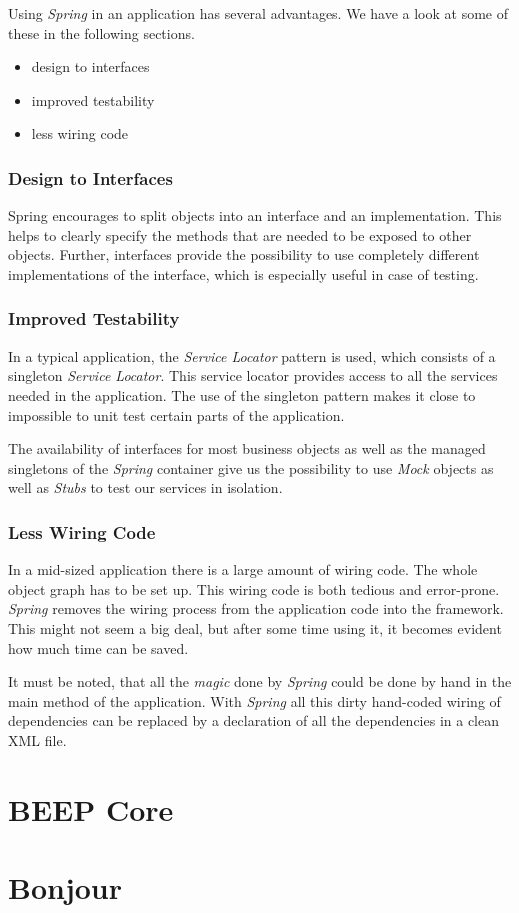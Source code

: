 Using \emph{Spring} in an application has several advantages. We have a look
at some of these in the following sections.

\begin{itemize}
 \item design to interfaces
 \item improved testability
 \item less wiring code
\end{itemize}

\subsubsection{Design to Interfaces}
Spring encourages to split objects into an interface and an implementation.
This helps to clearly specify the methods that are needed to be exposed to
other objects. Further, interfaces provide the possibility to use completely
different implementations of the interface, which is especially useful in
case of testing.

\subsubsection{Improved Testability}
In a typical application, the \emph{Service Locator} pattern is used, which
consists of a singleton \emph{Service Locator}. This service locator provides
access to all the services needed in the application. The use of the singleton
pattern makes it close to impossible to unit test certain parts of the
application.

The availability of interfaces for most business objects as well as the
managed singletons of the \emph{Spring} container give us the possibility
to use \emph{Mock} objects as well as \emph{Stubs} to test our services
in isolation.

\subsubsection{Less Wiring Code}
In a mid-sized application there is a large amount of wiring code. The whole
object graph has to be set up. This wiring code is both tedious and
error-prone. \emph{Spring} removes the wiring process from the application
code into the framework. This might not seem a big deal, but after some time
using it, it becomes evident how much time can be saved.

It must be noted, that all the \emph{magic} done by \emph{Spring} could be
done by hand in the main method of the application. With \emph{Spring} all
this dirty hand-coded wiring of dependencies can be replaced by a 
declaration of all the dependencies in a clean XML file.


\section{BEEP Core}


\section{Bonjour}


